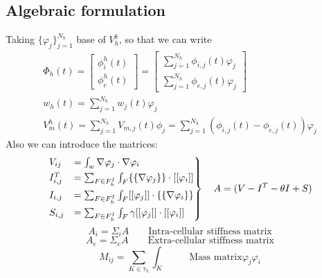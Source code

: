 \documentclass[a4paper,12pt]{article}
\begin{document}
    \subsection{Algebraic formulation}
    Taking $\{\varphi_j\}_{j=1}^{N_h}$ base of $V_h^k$, so that we can write
    \begin{equation*}
    \begin{gathered}
    \Phi_h(t) = \begin{bmatrix} \phi_i^h(t) \\ \phi_e^h(t) \end{bmatrix} = \begin {bmatrix}\sum_{j=1}^{N_h} \phi_{i,j}(t)\varphi_j \\ \sum_{j=1}^{N_h} \phi_{e,j}(t)\varphi_j \end{bmatrix}\\
    w_h(t) = \sum_{j=1}^{N_h}w_j(t)\varphi_j\\
    V_m^h(t)=\sum_{j=1}^{N_h} V_{m,j}(t) \phi_j=\sum_{j=1}^{N_h}(\phi_{i,j}(t)-\phi_{e,j}(t))\varphi_j
 \end{gathered}
 \end{equation*}
 Also we can introduce the matrices:
 \begin{equation}\label{matrices}
\begin{rcases}
V_{ij} &= \int_{w}\nabla\varphi_j \cdot \nabla \varphi_i 
\\ I_{i,j}^T &= \sum_{F \in F_h^I} \int_{F} \{\{\nabla\varphi_j\}\} \cdot [[\varphi_i]] 
\\ I_{i,j} &= \sum_{F \in F_h^I} \int_{F} [[\varphi_j]] \cdot \{\{\nabla \varphi_i\}\}
\\S_{i,j} &= \sum_{F \in F_h^I} \int_{F} \gamma [[\varphi_j]] \cdot [[\varphi_i]]
\end{rcases}
\begin{gathered}
\quad A = (V -I^T - \theta I + S)\\
\end{gathered}
\end{equation}
\begin{equation}
A_i=\Sigma_i A \qquad{\text{Intra-cellular stiffness matrix}}
\end{equation}
\begin{equation}
A_e=\Sigma_e A \qquad{\text{Extra-cellular stiffness matrix}}
\end{equation}
\begin{equation}
M_{ij} = \sum_{K \in \tau_h}\int_K \qquad{\text{Mass matrix}}
\varphi_j\varphi_i
\end{equation}
\end{document}
